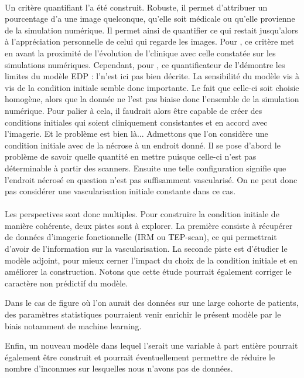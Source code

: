 \documentclass[main.tex]{subfiles}
\begin{document}
\paragraph{}
Un critère quantifiant l'\hetero a été construit. Robuste, il permet d'attribuer un pourcentage d'\hetero a une image quelconque, qu'elle soit médicale ou qu'elle provienne  de la simulation numérique. Il permet ainsi de quantifier ce qui restait jusqu'alors à l'appréciation personnelle de celui qui regarde les images. Pour \Nber, ce critère met en avant la proximité de l'évolution de l'\hetero clinique avec celle constatée sur les simulations numériques. Cependant, pour \Chen, ce quantificateur de l'\hetero démontre les limites du modèle EDP : l'\hetero n'est ici pas bien décrite. La sensibilité du modèle vis à vis de la condition initiale semble donc importante. Le fait que celle-ci soit choisie  homogène, alors que la donnée ne l'est pas biaise donc l'ensemble de la simulation numérique. Pour palier à cela, il faudrait alors être capable de créer des conditions initiales qui soient cliniquement consistantes et en accord avec l'imagerie. Et le problème est bien là... Admettons que l'on considère une condition initiale avec de la nécrose à un endroit donné. Il se pose d'abord le problème de savoir quelle quantité en mettre puisque celle-ci n'est pas déterminable à partir des scanners. Ensuite une telle configuration  signifie que l'endroit nécrosé en question n'est pas suffisamment vascularisé. On ne peut donc pas considérer une vascularisation initiale constante dans ce cas. 


\paragraph{}
Les perspectives sont donc multiples. 
Pour construire la condition initiale de manière cohérente, deux pistes sont à explorer. La première consiste à récupérer de données d'imagerie fonctionnelle (IRM ou TEP-scan), ce qui permettrait d'avoir de l'information sur la vascularisation. La seconde piste est d'étudier le modèle adjoint, pour mieux cerner l'impact du choix de la condition initiale et en améliorer la construction.  
Notons que cette étude pourrait également corriger le caractère non prédictif du modèle. 

Dans le cas de figure où l'on aurait des données sur une large cohorte de patients, des paramètres statistiques pourraient venir enrichir le présent modèle par le biais notamment de machine learning.

Enfin, un nouveau modèle dans lequel l'\hetero serait une variable à part entière pourrait également être construit et pourrait éventuellement permettre de réduire le nombre d'inconnues sur lesquelles nous n'avons pas de données.
\end{document}

